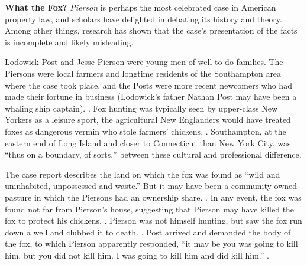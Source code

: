 





\item \textbf{What the Fox?} \emph{Pierson} is perhaps the most celebrated case
in American property law, and scholars have delighted in debating its history
and theory. Among other things, research has shown that the case's presentation
of the facts is incomplete and likely misleading.

Lodowick Post and Jesse Pierson were young men of well-to-do families. The
Piersons were local farmers and longtime residents of the Southampton area
where the case took place, and the Posts were more recent newcomers who had made
their fortune in business (Lodowick's father Nathan Post may have been a whaling
ship captain). . Fox hunting was typically seen by
upper-class New Yorkers as a leisure sport, the agricultural New Englanders
would have treated foxes as dangerous vermin who stole farmers' chickens.
.
Southampton, at the eastern end of Long Island and closer to Connecticut than
New York City, was ``thus on a boundary, of sorts,'' between these cultural and
professional difference.

The case report describes the land on which the fox was found as ``wild and
uninhabited, unpossessed and waste.'' But it may have been a community-owned
pasture in which the Piersons had an ownership share. . In any event, the fox was found not far from Pierson's house,
suggesting that Pierson may have killed the fox to protect his chickens.
. Pierson was not himself hunting, but saw
the fox run down a well and clubbed it to death. . Post arrived and demanded the body of the fox, to which Pierson apparently
responded, ``it may be you was going to kill him, but you did not kill him. I
was going to kill him and did kill him.'' .

